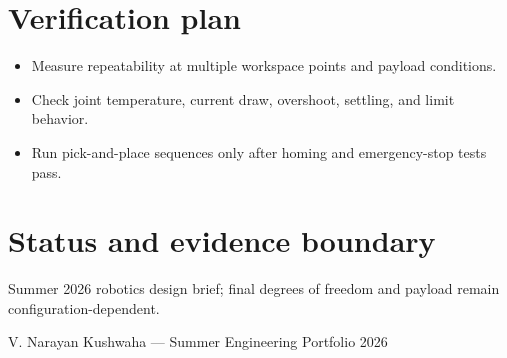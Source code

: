 \documentclass[10pt]{article}
\begin{document}
\section*{Verification plan}
\begin{itemize}
\item Measure repeatability at multiple workspace points and payload conditions.
\item Check joint temperature, current draw, overshoot, settling, and limit behavior.
\item Run pick-and-place sequences only after homing and emergency-stop tests pass.
\end{itemize}

\section*{Status and evidence boundary}
Summer 2026 robotics design brief; final degrees of freedom and payload remain configuration-dependent.

\vfill
\small\color{muted} V. Narayan Kushwaha --- Summer Engineering Portfolio 2026
\end{document}
